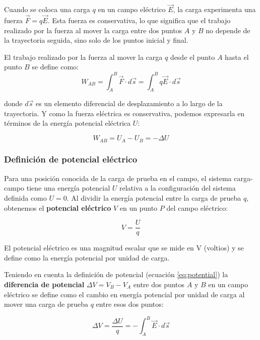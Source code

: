 Cuando se coloca una carga \(q\) en un campo eléctrico \(\vec{E}\), la carga experimenta una fuerza \(\vec{F}=q\vec{E}\). Esta fuerza es conservativa, lo que significa que el trabajo realizado por la fuerza al mover la carga entre dos puntos \(A\) y \(B\) no depende de la trayectoria seguida, sino solo de los puntos inicial y final.

El trabajo realizado por la fuerza al mover la carga \(q\) desde el punto \(A\) hasta el punto \(B\) se define como:
\begin{equation*}
    W_{AB} = \int_A^B \vec{F} \cdot d\vec{s} = \int_A^B q\vec{E} \cdot d\vec{s}
\end{equation*}

donde \(d\vec{s}\) es un elemento diferencial de desplazamiento a lo largo de la trayectoria. Y como la fuerza eléctrica es conservativa, podemos expresarla en términos de la energía potencial eléctrica \(U\):

\begin{equation*}
    W_{AB} = U_A - U_B = -\Delta U
\end{equation*}

\subsubsection{Definición de potencial eléctrico}

Para una posición conocida de la carga de prueba en el campo, el sistema carga-campo tiene una energía potencial \(U\) relativa a la configuración del sistema definida como \(U=0\). Al dividir la energía potencial entre la carga de prueba \(q\), obtenemos el \textbf{potencial eléctrico} \(V\) en un punto \(P\) del campo eléctrico:

\begin{equation}
    V = \frac{U}{q}
    \label{eq:potential}
\end{equation}

El potencial eléctrico es una magnitud escalar que se mide en \(\text{V}\) (voltios) y se define como la energía potencial por unidad de carga.

Teniendo en cuenta la definición de potencial (ecuación \eqref{eq:potential}) la \textbf{diferencia de potencial} \(\Delta V = V_B - V_A\) entre dos puntos \(A\) y \(B\) en un campo eléctrico se define como el cambio en energía potencial por unidad de carga al mover una carga de prueba \(q\) entre esos dos puntos:

\begin{equation}
    \Delta V = \frac{\Delta U}{q} = -\int_A^B \vec{E} \cdot d\vec{s}
    \label{eq:potential_difference}
\end{equation}

